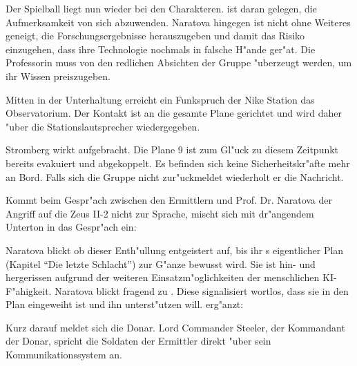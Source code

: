 Der Spielball liegt nun wieder bei den Charakteren. \xl{} ist daran gelegen, die Aufmerksamkeit von sich abzuwenden. Naratova hingegen ist nicht ohne Weiteres geneigt, die Forschungsergebnisse herauszugeben und damit das Risiko einzugehen, dass ihre Technologie nochmals in falsche H"ande ger"at. Die Professorin muss von den redlichen Absichten der Gruppe "uberzeugt werden, um ihr Wissen preiszugeben.

Mitten in der Unterhaltung erreicht ein Funkspruch der Nike Station das Observatorium. Der Kontakt ist an die gesamte Plane gerichtet und wird daher "uber die Stationslautsprecher wiedergegeben.


Stromberg wirkt aufgebracht. Die Plane 9 ist zum Gl"uck zu diesem Zeitpunkt bereits evakuiert und abgekoppelt. Es befinden sich keine Sicherheitskr"afte mehr an Bord. Falls sich die Gruppe nicht zur"uckmeldet wiederholt er die Nachricht. 

Kommt beim Gespr"ach zwischen den Ermittlern und Prof. Dr. Naratova der Angriff auf die Zeus II-2 nicht zur Sprache, mischt sich \xl{} mit dr"angendem Unterton in das Gespr"ach ein:


Naratova blickt ob dieser Enth"ullung entgeistert auf, bis ihr \xl{}s eigentlicher Plan (Kapitel "`Die letzte Schlacht"') zur G"anze bewusst wird. Sie ist hin- und hergerissen aufgrund der weiteren Einsatzm"oglichkeiten der menschlichen KI-F"ahigkeit. Naratova blickt fragend zu \ml{}. Diese signalisiert wortlos, dass sie in den Plan eingeweiht ist und ihn unterst"utzen will. \ml{} erg"anzt:


Kurz darauf meldet sich die Donar. Lord Commander Steeler, der Kommandant der Donar, spricht die Soldaten der Ermittler direkt "uber sein Kommunikationssystem an.

